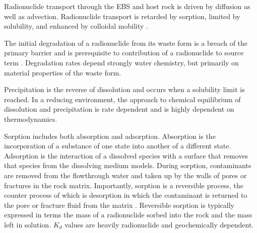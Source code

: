 Radionuclide transport through the \gls{EBS} and host rock is driven by 
diffusion as well as advection. Radionuclide transport is retarded by sorption, 
limited by solubility, and enhanced by colloidal mobility 
\cite{bracke_safety_2008}. 

The initial degradation of a radionuclide from its waste form is a breach of the 
primary barrier and is prerequisite to contribution of a radionuclide to source 
term \cite{bracke_safety_2008}.  Degradation rates depend strongly water 
chemistry, but primarily on material properties of the waste form.

Precipitation is the reverse of dissolution and occurs when a solubility limit
is reached. In a reducing environment, the approach to chemical equilibrium of 
dissolution and precipitation is rate dependent and is highly dependent on 
thermodynamics.

Sorption includes both absorption and adsorption. Absorption is the 
incorporation of a substance of one state into another of a different state.
Adsorption is the interaction of a dissolved species with a surface that
removes that species from the dissolving medium models. During sorption, 
contaminants are removed from the flowthrough water and taken up by the 
walls of pores or fractures in the rock matrix.  Importantly, sorption is a 
reversible process, the  counter process of which is desorption in which the 
contaminant is returned to the pore or fracture fluid from the matrix
\cite{ahn_mass_1988} . Reversible sorption is typically expressed in terms 
the mass of a radionuclide sorbed into the rock and the mass left in solution. 
$K_d$ values are heavily radionuclide and geochemically dependent.  





